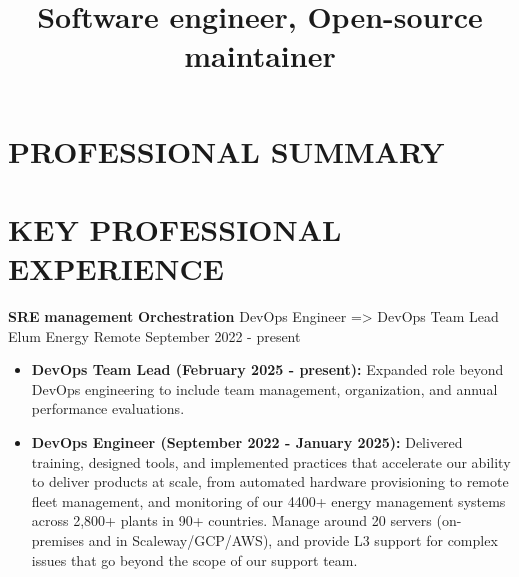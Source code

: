 \documentclass[11pt,a4paper]{moderncv}
\title{
  Software engineer, Open-source maintainer
}
\begin{document}
  \maketitle
  \vspace*{-3mm}

  \section{PROFESSIONAL SUMMARY}\label{sec:summary}

  \vspace{5mm}

  \section{KEY PROFESSIONAL EXPERIENCE}
  \label{sec:key-professional-experience}

  \cventry
    {\textbf{SRE} \textbf{management} \textbf{Orchestration}}
    {DevOps Engineer => DevOps Team Lead}
    {Elum Energy}
    {Remote}
    {September 2022 - present}{
    \begin{itemize}
        \item \textbf{DevOps Team Lead (February 2025 - present):} Expanded role beyond DevOps engineering to include team management,
        organization, and annual performance evaluations.
        \item \textbf{DevOps Engineer (September 2022 - January 2025):} Delivered training, designed tools,
            and implemented practices that accelerate our ability to deliver products at scale, from
            automated hardware provisioning to remote fleet management, and monitoring of our 4400+ energy management
		    systems across 2,800+ plants in 90+ countries. Manage around 20 servers (on-premises and in Scaleway/GCP/AWS),
            and provide L3 support for complex issues that go beyond the scope of our support team.
    \end{itemize}
    }
\end{document}
